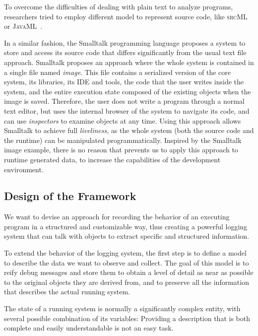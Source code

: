 To overcome the difficulties of dealing with plain text to analyze programs, researchers tried to employ different model to represent source code, like \textsc{srcML}~\cite{Male2002a} or \textsc{JavaML}~\cite{Badr2000}.

In a similar fashion, the Smalltalk programming language proposes a system to store and access its source code that differs significantly from the usual text file approach. Smalltalk proposes an approach where the whole system is contained in a single file named {\em image}. This file contains a serialized version of the core system, its libraries, its IDE and tools, the code that the user writes inside the system, and the entire execution state composed of the existing objects when the image is saved. Therefore, the user does not write a program through a normal text editor, but uses the internal browser of the system to navigate its code, and can use \emph{inspectors} to examine objects at any time. Using this approach allows Smalltalk to achieve full \emph{liveliness}, as the whole system (both the source code and the runtime) can be manipulated programmatically. Inspired by the Smalltalk image example, there is no reason that prevents us to apply this approach to runtime generated data, to increase the capabilities of the development environment.

\subsection{Design of the Framework}\label{sec:design}

We want to devise an approach for recording the behavior of an executing program in a structured and customizable way, thus creating a powerful logging system that can talk with objects to extract specific and structured information.

To extend the behavior of the logging system, the first step is to define a model to describe the data we want to observe and collect.
The goal of this model is to reify debug messages and store them to obtain a level of detail as near as possible to the original objects they are derived from, and to preserve all the information that describes the actual running system.

 The state of a running system is normally a significantly complex entity, with several possible combination of its variables: Providing a description that is both complete and easily understandable is not an easy task.

